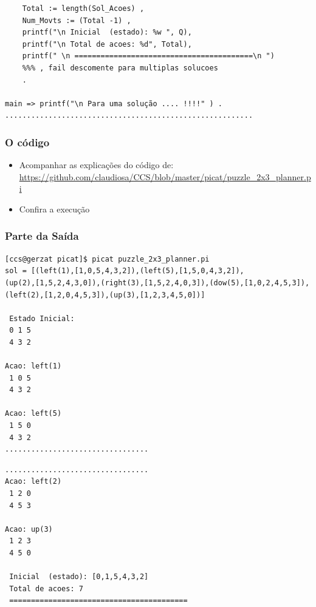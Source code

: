 \begin{frame}[fragile, allowframebreaks=0.9]
\begin{small}
\begin{verbatim}
    Total := length(Sol_Acoes) ,
    Num_Movts := (Total -1) ,
    printf("\n Inicial  (estado): %w ", Q),
    printf("\n Total de acoes: %d", Total), 
    printf(" \n =========================================\n ")
    %%% , fail descomente para multiplas solucoes
    .
   
main => printf("\n Para uma solução .... !!!!" ) .
.........................................................
\end{verbatim}

\end{small}

\end{frame}



\begin{frame}[fragile]
 \frametitle{O código}

\begin{itemize}
  \item Acompanhar as explicações do código de:\\
\url{https://github.com/claudiosa/CCS/blob/master/picat/puzzle_2x3_planner.pi}

  \item Confira a execuç\~ao
\end{itemize}
\end{frame}


\begin{frame}[fragile, allowframebreaks=0.9]
 \frametitle{Parte da Saída}

\begin{small}
\begin{verbatim}
[ccs@gerzat picat]$ picat puzzle_2x3_planner.pi 
sol = [(left(1),[1,0,5,4,3,2]),(left(5),[1,5,0,4,3,2]),
(up(2),[1,5,2,4,3,0]),(right(3),[1,5,2,4,0,3]),(dow(5),[1,0,2,4,5,3]),
(left(2),[1,2,0,4,5,3]),(up(3),[1,2,3,4,5,0])]

 Estado Inicial: 
 0 1 5
 4 3 2

Acao: left(1)
 1 0 5
 4 3 2

Acao: left(5)
 1 5 0
 4 3 2
.................................
\end{verbatim}
\end{small}

\framebreak
\begin{small}
\begin{verbatim}
.................................
Acao: left(2)
 1 2 0
 4 5 3

Acao: up(3)
 1 2 3
 4 5 0

 Inicial  (estado): [0,1,5,4,3,2] 
 Total de acoes: 7 
 =========================================

\end{verbatim}
\end{small}

\end{frame}



